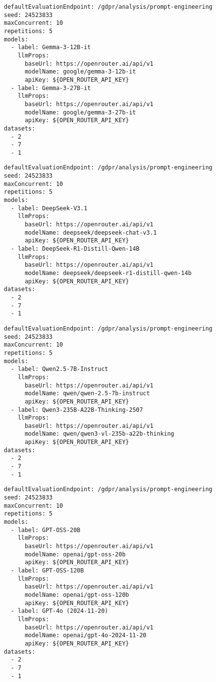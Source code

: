 \begin{lstlisting}[caption={Konfigurationsdatei des Experiments mit Gemma Modellen}, label={lst:gemma-experiment-config}]
defaultEvaluationEndpoint: /gdpr/analysis/prompt-engineering
seed: 24523833
maxConcurrent: 10
repetitions: 5
models:
  - label: Gemma-3-12B-it
    llmProps:
      baseUrl: https://openrouter.ai/api/v1
      modelName: google/gemma-3-12b-it
      apiKey: ${OPEN_ROUTER_API_KEY}
  - label: Gemma-3-27B-it
    llmProps:
      baseUrl: https://openrouter.ai/api/v1
      modelName: google/gemma-3-27b-it
      apiKey: ${OPEN_ROUTER_API_KEY}
datasets:
  - 2
  - 7
  - 1
\end{lstlisting}

\begin{lstlisting}[caption={Konfigurationsdatei des Experiments mit DeepSeek Modellen}, label={lst:deepseek-experiment-config}]
defaultEvaluationEndpoint: /gdpr/analysis/prompt-engineering
seed: 24523833
maxConcurrent: 10
repetitions: 5
models:
  - label: DeepSeek-V3.1
    llmProps:
      baseUrl: https://openrouter.ai/api/v1
      modelName: deepseek/deepseek-chat-v3.1
      apiKey: ${OPEN_ROUTER_API_KEY}
  - label: DeepSeek-R1-Distill-Qwen-14B
    llmProps:
      baseUrl: https://openrouter.ai/api/v1
      modelName: deepseek/deepseek-r1-distill-qwen-14b
      apiKey: ${OPEN_ROUTER_API_KEY}
datasets:
  - 2
  - 7
  - 1
\end{lstlisting}

\begin{lstlisting}[caption={Konfigurationsdatei des Experiments mit Qwen Modellen}, label={lst:qwen-experiment-config}]
defaultEvaluationEndpoint: /gdpr/analysis/prompt-engineering
seed: 24523833
maxConcurrent: 10
repetitions: 5
models:
  - label: Qwen2.5-7B-Instruct
    llmProps:
      baseUrl: https://openrouter.ai/api/v1
      modelName: qwen/qwen-2.5-7b-instruct
      apiKey: ${OPEN_ROUTER_API_KEY}
  - label: Qwen3-235B-A22B-Thinking-2507
    llmProps:
      baseUrl: https://openrouter.ai/api/v1
      modelName: qwen/qwen3-vl-235b-a22b-thinking
      apiKey: ${OPEN_ROUTER_API_KEY}
datasets:
  - 2
  - 7
  - 1
\end{lstlisting}

\begin{lstlisting}[caption={Konfigurationsdatei des Experiments mit GPT Modellen}, label={lst:gpt-oss-experiment-config}]
defaultEvaluationEndpoint: /gdpr/analysis/prompt-engineering
seed: 24523833
maxConcurrent: 10
repetitions: 5
models:
  - label: GPT-OSS-20B
    llmProps:
      baseUrl: https://openrouter.ai/api/v1
      modelName: openai/gpt-oss-20b
      apiKey: ${OPEN_ROUTER_API_KEY}
  - label: GPT-OSS-120B
    llmProps:
      baseUrl: https://openrouter.ai/api/v1
      modelName: openai/gpt-oss-120b
      apiKey: ${OPEN_ROUTER_API_KEY}
  - label: GPT-4o (2024-11-20)
    llmProps:
      baseUrl: https://openrouter.ai/api/v1
      modelName: openai/gpt-4o-2024-11-20
      apiKey: ${OPEN_ROUTER_API_KEY}
datasets:
  - 2
  - 7
  - 1
\end{lstlisting}
